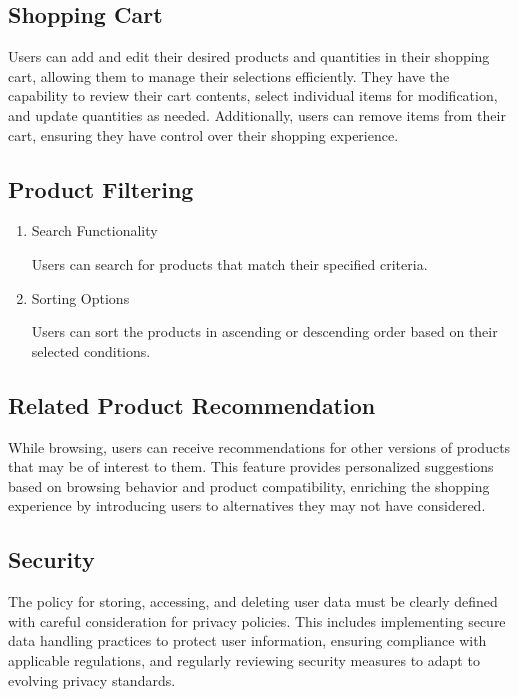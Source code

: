 \documentclass[conference]{IEEEtran}
\begin{document}
\subsection{Shopping Cart} 

Users can add and edit their desired products and quantities in their shopping cart, allowing them to manage their selections efficiently. They have the capability to review their cart contents, select individual items for modification, and update quantities as needed. Additionally, users can remove items from their cart, ensuring they have control over their shopping experience.

\subsection{Product Filtering}

\begin{enumerate}
\setlength{\parindent}{2ex}
\setlength{\parskip}{0.5em}
\item Search Functionality

Users can search for products that match their specified criteria.

\item Sorting Options

Users can sort the products in ascending or descending order based on their selected conditions.

\end{enumerate}

\subsection{Related Product Recommendation}

While browsing, users can receive recommendations for other versions of products that may be of interest to them. This feature provides personalized suggestions based on browsing behavior and product compatibility, enriching the shopping experience by introducing users to alternatives they may not have considered.

\subsection{Security}

The policy for storing, accessing, and deleting user data must be clearly defined with careful consideration for privacy policies. This includes implementing secure data handling practices to protect user information, ensuring compliance with applicable regulations, and regularly reviewing security measures to adapt to evolving privacy standards.
\end{document}

